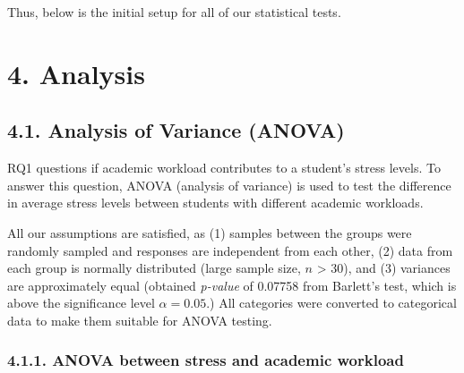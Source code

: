\documentclass[
  letterpaper,
  DIV=11,
  numbers=noendperiod]{scrartcl}
\begin{document}
Thus, below is the initial setup for all of our statistical tests.

\section{4. Analysis}\label{analysis}

\subsection{4.1. Analysis of Variance
(ANOVA)}\label{analysis-of-variance-anova}

RQ1 questions if academic workload contributes to a student's stress
levels. To answer this question, ANOVA (analysis of variance) is used to
test the difference in average stress levels between students with
different academic workloads.

All our assumptions are satisfied, as (1) samples between the groups
were randomly sampled and responses are independent from each other, (2)
data from each group is normally distributed (large sample size, \(n\)
\textgreater{} 30), and (3) variances are approximately equal (obtained
\emph{p-value} of 0.07758 from Barlett's test, which is above the
significance level \(\alpha = 0.05\).) All categories were converted to
categorical data to make them suitable for ANOVA testing.

\subsubsection{4.1.1. ANOVA between stress and academic
workload}\label{anova-between-stress-and-academic-workload}
\end{document}
